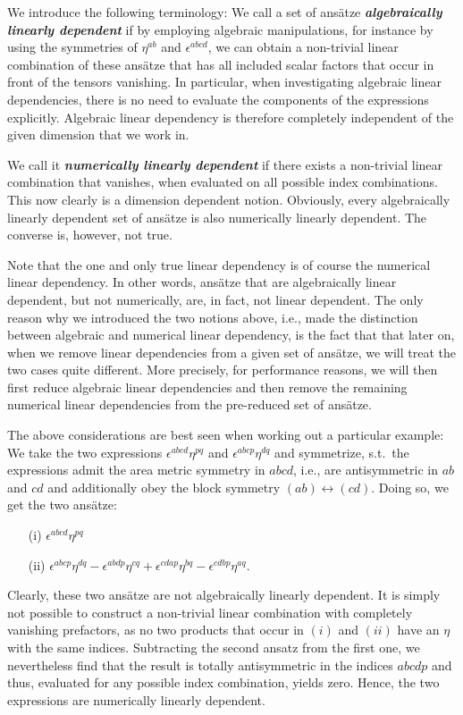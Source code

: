 We introduce the following terminology: We call a set of ansätze \textit{\textbf{algebraically linearly dependent}} if by employing algebraic manipulations, for instance by using the symmetries of $\eta^{ab}$ and $\epsilon^{abcd}$, we can obtain a non-trivial linear combination of these ansätze that has all included scalar factors that occur in front of the tensors vanishing. In particular, when investigating algebraic linear dependencies, there is no need to evaluate the components of the expressions explicitly. Algebraic linear dependency is therefore completely  independent of the given dimension that we work in. 

We call it \textbf{\textit{numerically linearly dependent}} if there exists a non-trivial linear combination that vanishes, when evaluated on all possible index combinations. This now clearly is a dimension dependent notion. Obviously, every algebraically linearly dependent set of ansätze is also numerically linearly dependent. The converse is, however, not true. 

\begin{remark}
Note that the one and only true linear dependency is of course the numerical linear dependency. In other words, ansätze that are algebraically linear dependent, but not numerically, are, in fact, not linear dependent. The only reason why we introduced the two notions above, i.e., made the distinction between algebraic and numerical linear dependency, is the fact that that later on, when we remove linear dependencies from a given set of ansätze, we will treat the two cases quite different. More precisely, for performance reasons, we will then first reduce algebraic linear dependencies and then remove the remaining numerical linear dependencies from the pre-reduced set of ansätze. 
\end{remark}

The above considerations are best seen when working out a particular example: We take the two expressions $\epsilon^{abcd} \eta^{pq}$ and $\epsilon^{abcp} \eta^{dq}$ and symmetrize, s.t.\ the expressions admit the area metric symmetry in $abcd$, i.e., are antisymmetric in $ab$ and $cd$ and additionally obey the block symmetry $(ab) \leftrightarrow (cd)$. Doing so, we get the two ansätze: 
\begin{itemize}
\item[(i)] $\epsilon^{abcd} \eta^{pq}$ 
\item[(ii)] $\epsilon^{abcp} \eta^{dq} - \epsilon^{abdp} \eta^{cq} + \epsilon^{cdap} \eta^{bq} - \epsilon^{cdbp} \eta^{aq}$.
\end{itemize}
Clearly, these two ansätze are not algebraically linearly dependent. It is simply not possible to construct a non-trivial linear combination with completely vanishing prefactors, as no two products that occur in $(i)$ and $(ii)$ have an $\eta$ with the same indices.  Subtracting the second ansatz from the first one, we nevertheless find that the result is totally antisymmetric in the indices $abcdp$ and thus, evaluated for any possible index combination, yields zero. Hence, the two expressions are numerically linearly dependent.

